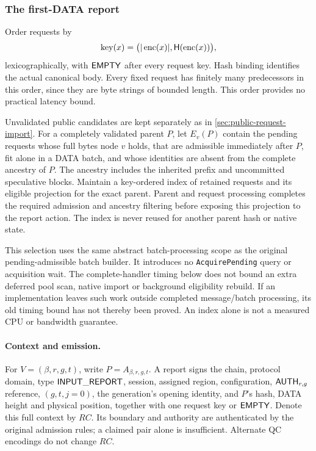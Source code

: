 

\subsubsection{The first-DATA report}
\label{sec:input-report}
Order requests by
\[
 \operatorname{key}(x)=
   \bigl(|\operatorname{enc}(x)|,\mathsf H(\operatorname{enc}(x))\bigr),
\]
lexicographically, with $\mathsf{EMPTY}$ after every request key. Hash binding
identifies the actual canonical body. Every fixed request has finitely
many predecessors in this order, since they are byte strings of bounded
length. This order provides no practical latency bound.

Unvalidated public candidates are kept separately as in
\cref{sec:public-request-import}. For a completely validated parent $P$,
let $E_v(P)$ contain the pending
requests whose full bytes node $v$ holds, that are admissible immediately
after $P$, fit alone in a DATA batch, and whose identities are absent from
the complete ancestry of $P$. The ancestry includes the inherited prefix
and uncommitted speculative blocks. Maintain a key-ordered index of
retained requests and its eligible projection for the exact parent.
Parent and request processing completes the required admission and
ancestry filtering before exposing this projection to the report action.
The index is never reused for another parent hash or native state.

This selection uses the same abstract batch-processing scope as the
original pending-admissible batch builder. It introduces no
\texttt{AcquirePending} query or acquisition wait. The complete-handler
timing below does not bound an extra deferred pool scan, native import
or background eligibility rebuild. If an implementation leaves such
work outside completed message/batch processing, its old timing bound
has not thereby been proved. An index alone is not a measured CPU or
bandwidth guarantee.

\paragraph{Context and emission.}
For $V=(\beta,r,g,t)$, write $P=A_{\beta,r,g,t}$. A report signs the chain,
protocol domain, type $\mathsf{INPUT\_REPORT}$, session, assigned region,
configuration, $\mathsf{AUTH}_{r,g}$ reference, $(g,t,j=0)$, the generation's
opening identity, and $P$'s hash, DATA height and physical position,
together with one request key or $\mathsf{EMPTY}$. Denote this full context
by $\mathit{RC}$. Its boundary and authority are authenticated by the
original admission rules; a claimed pair alone is insufficient.
Alternate QC encodings do not change $\mathit{RC}$.

